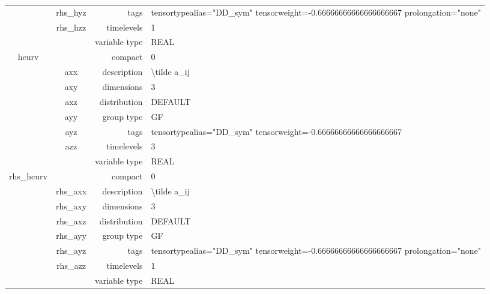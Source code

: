 \begin{tabular*}{150mm}{|c|c@{\extracolsep{\fill}}|rl|}
 & rhs\_hyz & tags & tensortypealias="DD\_sym" tensorweight=-0.66666666666666666667 prolongation="none" \\ 
 & rhs\_hzz & timelevels & 1 \\ 
 &  & variable type & REAL \\ 
\hline 
hcurv &  & compact & 0 \\ 
 & axx & description & {\textbackslash}tilde a\_ij \\ 
 & axy & dimensions & 3 \\ 
 & axz & distribution & DEFAULT \\ 
 & ayy & group type & GF \\ 
 & ayz & tags & tensortypealias="DD\_sym" tensorweight=-0.66666666666666666667 \\ 
 & azz & timelevels & 3 \\ 
 &  & variable type & REAL \\ 
\hline 
rhs\_hcurv &  & compact & 0 \\ 
 & rhs\_axx & description & {\textbackslash}tilde a\_ij \\ 
 & rhs\_axy & dimensions & 3 \\ 
 & rhs\_axz & distribution & DEFAULT \\ 
 & rhs\_ayy & group type & GF \\ 
 & rhs\_ayz & tags & tensortypealias="DD\_sym" tensorweight=-0.66666666666666666667 prolongation="none" \\ 
 & rhs\_azz & timelevels & 1 \\ 
 &  & variable type & REAL \\ 
\hline 
\end{tabular*} 



\vspace{5mm}
\vspace{5mm}


